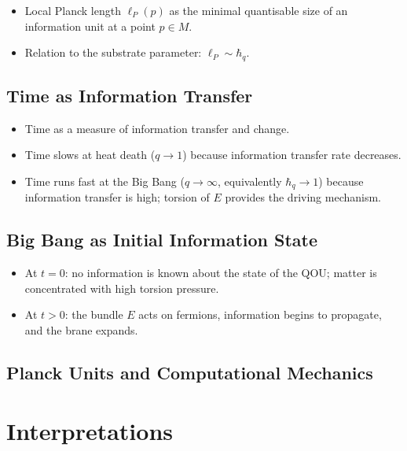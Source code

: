 \documentclass[12pt,a4paper]{report}
\begin{document}
\begin{itemize}
  \item Local Planck length $\ell_P(p)$ as the minimal quantisable size of an
        information unit at a point $p \in M$.
  \item Relation to the substrate parameter: $\ell_P \sim \hbar_q$.
\end{itemize}



\section{Time as Information Transfer}
\label{sec:time-info}

\begin{itemize}
  \item Time as a measure of information transfer and change.
  \item Time slows at heat death ($q \to 1$) because information transfer
        rate decreases.
  \item Time runs fast at the Big Bang ($q \to \infty$, equivalently $\hbar_q \to 1$) because information
        transfer is high; torsion of $E$ provides the driving mechanism.
\end{itemize}



\section{Big Bang as Initial Information State}
\label{sec:big-bang-info}

\begin{itemize}
  \item At $t = 0$: no information is known about the state of the QOU;
        matter is concentrated with high torsion pressure.
  \item At $t > 0$: the bundle $E$ acts on fermions, information begins to
        propagate, and the brane expands.
\end{itemize}



\section{Planck Units and Computational Mechanics}
\label{sec:planck-computation}



 \chapter{Interpretations}
\label{chap:interpretations}
\end{document}
